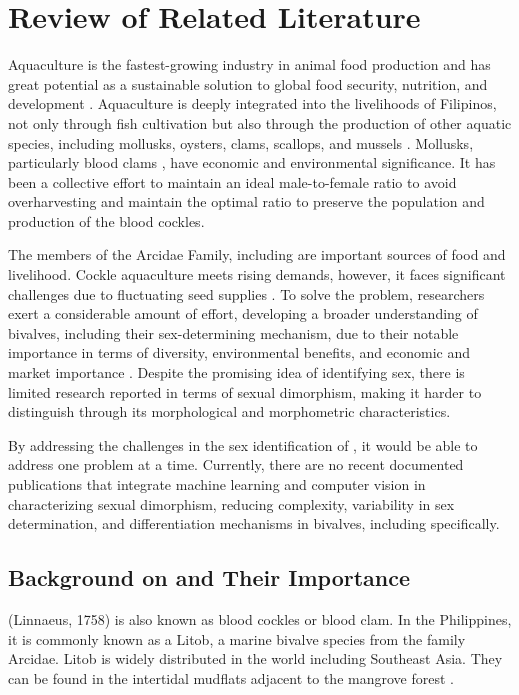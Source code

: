 \chapter{Review of Related Literature}
\label{sec:relatedlit}

Aquaculture is the fastest-growing industry in animal food production and has great potential as a sustainable solution to global food security, nutrition, and development \cite{fao2024}. Aquaculture is deeply integrated into the livelihoods of Filipinos, not only through fish cultivation but also through the production of other aquatic species, including mollusks, oysters, clams, scallops, and mussels \cite{breton2017sex}. Mollusks, particularly blood clams \Tegillarcagranosa, have economic and environmental significance. It has been a collective effort to maintain an ideal male-to-female ratio to avoid overharvesting and maintain the optimal ratio to preserve the population and production of the blood cockles. 
	
The members of the Arcidae Family, including \Tgranosa are important sources of food and livelihood. Cockle aquaculture meets rising demands, however, it faces significant challenges due to fluctuating seed supplies \cite{miranda2023}. To solve the problem, researchers exert a considerable amount of effort, developing a broader understanding of bivalves, including their sex-determining mechanism, due to their notable importance in terms of diversity, environmental benefits, and economic and market importance \cite{breton2017sex}. Despite the promising idea of identifying sex, there is limited research reported in terms of sexual dimorphism, making it harder to distinguish through its morphological and morphometric characteristics. 

By addressing the challenges in the sex identification of \Tgranosa, it would be able to address one problem at a time. Currently, there are no recent documented publications that integrate machine learning and computer vision in characterizing sexual dimorphism, reducing complexity, variability in sex determination, and differentiation mechanisms in bivalves, including \Tgranosa specifically.

\section{Background on \textit{\Tegillarcagranosa} and Their Importance}
\textit{\Tegillarcagranosa}(Linnaeus, 1758) is also known as blood cockles or blood clam. In the Philippines, it is commonly known as a Litob, a marine bivalve species from the family Arcidae. Litob is widely distributed in the world including Southeast Asia. They can be found in the intertidal mudflats adjacent to the mangrove forest \cite{srisunont2020}.

